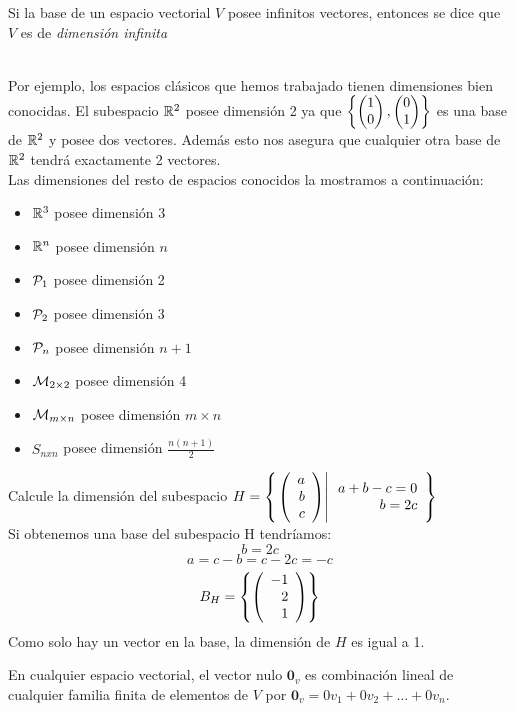 Si la base de un espacio vectorial $V$ posee infinitos vectores, entonces se dice que $V$ es de  \textit{dimensi\'on infinita} 

~\\
Por ejemplo, los espacios clásicos que hemos trabajado tienen dimensiones bien conocidas. El subespacio $\mathbb{R}^2 $ posee dimensión 2 ya que $ \left\{\begin{pmatrix} 1\\ 0\\ \end{pmatrix} , \begin{pmatrix} 0\\ 1\\ \end{pmatrix}  \right\} $ es una base de $\mathbb{R}^2$ y posee dos vectores. Además esto nos asegura que cualquier otra base de $ \mathbb{R}^2$ tendrá exactamente 2 vectores.
~\\

Las dimensiones del resto de espacios conocidos la mostramos a continuación:

\begin{itemize}
\item $\mathbb{R}^3 $ posee dimensión 3
\item $\mathbb{R}^n$ posee dimensión $n$
\item $\mathcal{P}_1$ posee dimensión 2
\item $\mathcal{P}_2$ posee dimensión 3
\item $\mathcal{P}_n$ posee dimensión $n+1$
\item $\mathcal{M}_{2\times 2}$ posee  dimensión 4
\item $\mathcal{M}_{m\times n}$ posee  dimensión $m\times n$ 
\item $S_{nxn}$ posee  dimensión $\frac{n(n+1)}{2}$ 

\end{itemize}
\begin{ejemplo}
Calcule la dimensión del subespacio $H=\left\{ \left. \left( \begin{array}{r} a\\ b\\ c \end{array} \right) \right| \begin{array}{r}
a+b-c=0\\
b=2c\\
\end{array} \right\}$
~\\
\sol
Si obtenemos una base del subespacio H tendríamos:
\[b=2c\]
\[ a=c-b=c-2c=-c\]
\[B_H= \left\{\left( \begin{array}{r} -1\\ 2\\ 1 \end{array} \right)  \right\} \]
Como solo hay un vector en la base, la dimensión de $H$ es igual a 1.

\end{ejemplo}

\begin{obsimp}
En cualquier espacio vectorial, el vector nulo $\mathbf{0}_v$ es combinación lineal de cualquier familia finita de elementos de $V$  por $\mathbf{0}_v = 0 v_1 + 0 v_2 + \ldots + 0 v_n$.\\
\end{obsimp}


